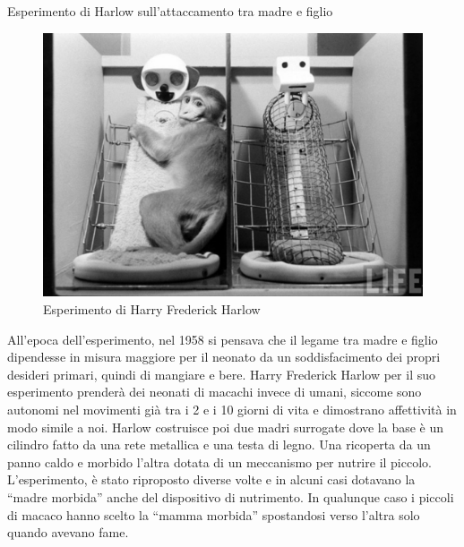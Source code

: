 \documentclass[12pt]{book} %
\begin{document}
\needspace{4cm}
\begin{mdframed}[linewidth=1pt]
Esperimento di Harlow sull'attaccamento tra madre e figlio 

\needspace{4cm}
\begin{figure}
  \centering
  \includegraphics[width=0.95\linewidth]{images/Libro-img017.jpg}
  \begin{minipage}{\linewidth}
    \caption{Esperimento di Harry Frederick Harlow}
  \end{minipage}
\end{figure}

All'epoca dell'esperimento, nel 1958 si pensava che il legame tra madre e
figlio dipendesse in misura maggiore per il neonato da un soddisfacimento dei propri desideri primari, quindi di
mangiare e bere. Harry Frederick Harlow per il suo esperimento prenderà dei neonati di macachi invece di umani, siccome
sono autonomi nel movimenti già tra i 2 e i 10 giorni di vita e dimostrano affettività in modo simile a noi. Harlow
costruisce poi due madri surrogate dove la base è un cilindro fatto da una rete metallica e una testa di legno. Una
ricoperta da un panno caldo e morbido l'altra dotata di un meccanismo per nutrire il piccolo.
L'esperimento, è stato riproposto diverse volte e in alcuni casi dotavano la “madre morbida” anche
del dispositivo di nutrimento. In qualunque caso i piccoli di macaco hanno scelto la “mamma morbida” spostandosi
verso l'altra solo quando avevano fame.


\end{mdframed}
\end{document}

